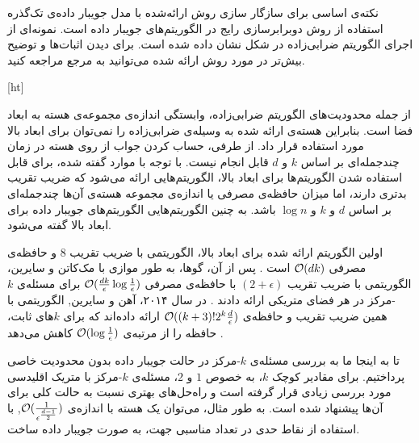 نکته‌ی اساسی برای سازگار سازی روش ارائه‌شده با مدل جویبار داده‌ی تک‌گذره استفاده از روش دوبرابرسازی رایج در الگوریتم‌های جویبار داده است.
نمونه‌ای از اجرای الگوریتم ضرابی‌زاده در شکل  نشان داده شده است.
برای دیدن اثبات‌ها و توضیح بیش‌تر در مورد روش ارائه شده می‌توانید به مرجع  مراجعه کنید.

[ht]

از جمله محدودیت‌های الگوریتم ضرابی‌زاده، وابستگی اندازه‌ی مجموعه‌ی هسته به ابعاد فضا است.
بنابراین هسته‌ی ارائه شده به وسیله‌ی ضرابی‌زاده را نمی‌توان برای ابعاد بالا مورد استفاده قرار داد.
از طرفی، حساب کردن جواب از روی هسته در زمان چندجمله‌ای بر اساس $k$ و $d$ قابل انجام نیست.
با توجه با موارد گفته شده، برای قابل استفاده شدن الگوریتم‌ها برای ابعاد بالا، الگوریتم‌هایی ارائه می‌شود که ضریب تقریب بدتری دارند، اما میزان حافظه‌ی مصرفی یا اندازه‌ی مجموعه هسته‌ی آن‌ها چندجمله‌ای بر اساس $d$ و $k$ و $\log{n}$ باشد.
به چنین الگوریتم‌هایی الگوریتم‌های جویبار داده برای ابعاد بالا گفته می‌شود. 

اولین الگوریتم ارائه شده برای ابعاد بالا،  الگوریتمی با ضریب تقریب $8$ و حافظه‌ی مصرفی $\mathcal{O}(dk)$ است .
پس از آن، گوها، به طور موازی با مک‌کاتن و سایرین، الگوریتمی با ضریب تقریب $(2+\epsilon)$ با حافظه‌ی مصرفی $\mathcal{O}(\frac{dk}{\epsilon} \log{\frac{1}{\epsilon}})$ برای مسئله‌ی $k$-مرکز در هر فضای متریکی ارائه دادند .
در سال ۲۰۱۴، آهن و سایرین, الگوریتمی با همین ضریب تقریب و حافظه‌ی $\mathcal{O}((k+3)!2^k\frac{d}{\epsilon})$ ارائه داده‌اند که برای $k$‌های ثابت، حافظه را از مرتبه‌ی $\mathcal{O}(\log{\frac{1}{\epsilon}})$ کاهش می‌دهد . 

تا به اینجا ما به بررسی مسئله‌ی $k$-مرکز در حالت جویبار داده بدون محدودیت خاصی پرداختیم.
برای مقادیر کوچک $k$، به خصوص $1$ و $2$، مسئله‌ی $k$-مرکز با متریک اقلیدسی مورد بررسی زیادی قرار گرفته است و راه‌حل‌های بهتری نسبت به حالت کلی برای آن‌ها پیشنهاد شده است.
به طور مثال، می‌توان یک هسته با اندازه‌ی $\mathcal{O}(\frac{1}{\epsilon^{\frac{d-1}{2}}})$, با استفاده از نقاط حدی در تعداد مناسبی جهت، به صورت جویبار داده ساخت. 


